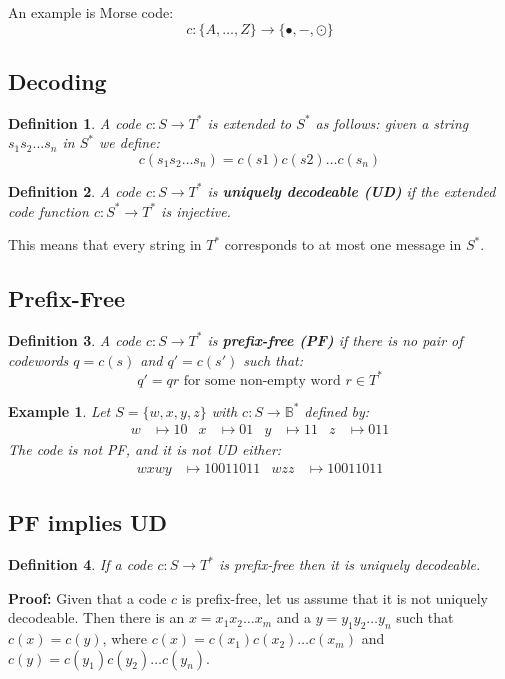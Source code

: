 \documentclass[11pt]{article}
\newtheorem{defn}{Definition}
\newtheorem{eg}{Example}
\begin{document}
An example is Morse code:
\[ c : \{ A, \ldots, Z \} \rightarrow \{ \bullet, -,\odot \} \]

\subsection{Decoding}
\begin{defn}
  A code $c : S \rightarrow T^*$ is extended to $S^*$ as follows: given a string $s_1 s_2 \ldots s_n$ in $S^*$ we define:
  \[ c(s_1 s_2 \ldots s_n) = c(s1) c(s2) \ldots c(s_n) \]
\end{defn}

\begin{defn}
  A code $c : S \rightarrow T^*$ is \textbf{uniquely decodeable (UD)} if the extended code function $c : S^* \rightarrow T^*$ is injective.
\end{defn}

This means that every string in $T^*$ corresponds to at most one message in $S^*$.

\subsection{Prefix-Free}
\begin{defn}
  A code $c : S \rightarrow T^*$ is \textbf{prefix-free (PF)} if there is no pair of codewords $q = c(s)$ and $q' = c(s')$ such that:
  \[ q' = qr \text{ for some non-empty word } r \in T^* \]
\end{defn}

\begin{eg}
  Let $S = \{ w, x, y, z\}$ with $c : S \rightarrow \mathbb{B}^*$ defined by:
  \begin{align*}
    w &\mapsto 10 & x &\mapsto 01 & y &\mapsto 11 & z &\mapsto 011
  \end{align*}
  The code is not PF, and it is not UD either:
  \begin{align*}
    wxwy &\mapsto 10011011 & wzz &\mapsto 10011011
  \end{align*}
\end{eg}

\subsection{PF implies UD}
\begin{defn}
  If a code $c : S \rightarrow T^*$ is prefix-free then it is uniquely decodeable.
\end{defn}

\textbf{Proof:}
Given that a code $c$ is prefix-free, let us assume that it is not uniquely decodeable.
Then there is an $x = x_1 x_2 \ldots x_m$ and a $y = y_1 y_2 \ldots y_n$ such that $c(x) = c(y)$, where $c(x) = c(x_1) c(x_2) \ldots c(x_m)$ and $c(y) = c(y_1) c(y_2) \ldots c(y_n)$. \\
\end{document}
